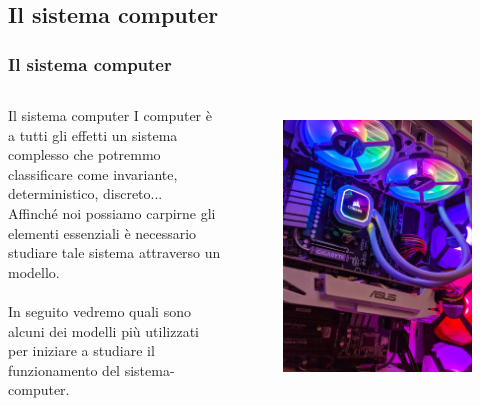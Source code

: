 \subsection[Il sistema computer]{Il sistema computer}
\begin{frame}
	\frametitle{Il sistema computer}
	
	\begin{columns}			
		\begin{block}{Il sistema computer}
			I computer è a tutti gli effetti un sistema complesso che potremmo classificare come invariante, deterministico, discreto...\\
			Affinché noi possiamo carpirne gli elementi essenziali è necessario studiare tale sistema attraverso un modello.\\~\\
			In seguito vedremo quali sono alcuni dei modelli più utilizzati per iniziare a studiare il funzionamento del sistema-computer.			
		\end{block}
		
		\begin{figure}[!htbp]
			\centering 
			\includegraphics[width=0.95\linewidth]{images/1_i_sistemi/computer.jpeg}
			\label{fig:systems_computer}
		\end{figure}		
	\end{columns}
	
	
\end{frame}






